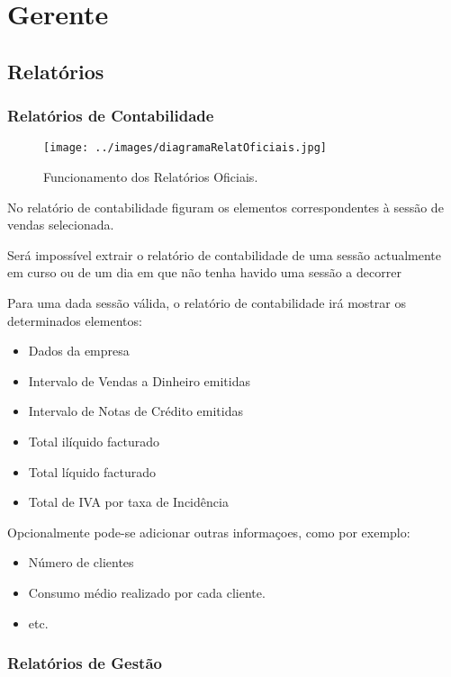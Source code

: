 \documentclass[a4paper,11pt,openany]{memoir}
\begin{document}
\chapter{Gerente}

\section{Relatórios}

\subsection{Relatórios de Contabilidade}

\begin{figure}
\texttt{[image: ../images/diagramaRelatOficiais.jpg]}
\caption[Submanifold]{Funcionamento dos Relatórios Oficiais.}
\end{figure}

No relatório de contabilidade figuram os elementos correspondentes à sessão de vendas selecionada.

Será impossível extrair o relatório de contabilidade de uma sessão actualmente em curso ou de
 um dia em que não tenha havido uma sessão a decorrer

Para uma dada sessão válida, o relatório de contabilidade irá mostrar os determinados elementos:
\begin{itemize}
\item Dados da empresa
\item Intervalo de Vendas a Dinheiro emitidas
\item Intervalo de Notas de Crédito emitidas
\item Total ilíquido facturado
\item Total líquido facturado
\item Total de IVA por taxa de Incidência
\end{itemize}

Opcionalmente pode-se adicionar outras informaçoes, como por exemplo: 
\begin{itemize}
\item Número de clientes
\item Consumo médio realizado por cada cliente.
\item etc.
\end{itemize}


\subsection{Relatórios de Gestão}
\end{document}
